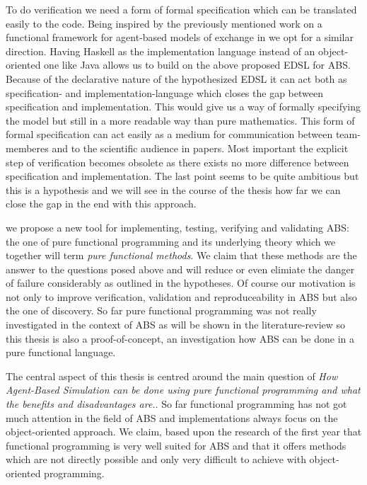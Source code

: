 To do verification we need a form of formal specification which can be translated easily to the code. Being inspired by the previously mentioned work on a functional framework for agent-based models of exchange in \cite{botta_functional_2011} we opt for a similar direction. Having Haskell as the implementation language instead of an object-oriented one like Java allows us to build on the above proposed EDSL for ABS. Because of the declarative nature of the hypothesized EDSL it can act both as specification- and implementation-language which closes the gap between specification and implementation. This would give us a way of formally specifying the model but still in a more readable way than pure mathematics. This form of formal specification can act easily as a medium for communication between team-memberes and to the scientific audience in papers. Most important the explicit step of verification becomes obsolete as there exists no more difference between specification and implementation. The last point seems to be quite ambitious but this is a hypothesis and we will see in the course of the thesis how far we can close the gap in the end with this approach.

we propose a new tool for implementing, testing, verifying and validating ABS: the one of pure functional programming and its underlying theory which we together will term \textit{pure functional methods}. We claim that these methods are the answer to the questions posed above and will reduce or even elimiate the danger of failure considerably as outlined in the hypotheses. 
Of course our motivation is not only to improve verification, validation and reproduceability in ABS but also the one of discovery. So far pure functional programming was not really investigated in the context of ABS as will be shown in the literature-review so this thesis is also a proof-of-concept, an investigation how ABS can be done in a pure functional language.

The central aspect of this thesis is centred around the main question of \textit{How Agent-Based Simulation can be done using pure functional programming and what the benefits and disadvantages are.}. So far functional programming has not got much attention in the field of ABS and implementations always focus on the object-oriented approach. We claim, based upon the research of the first year that functional programming is very well suited for ABS and that it offers methods which are not directly possible and only very difficult to achieve with object-oriented programming.

